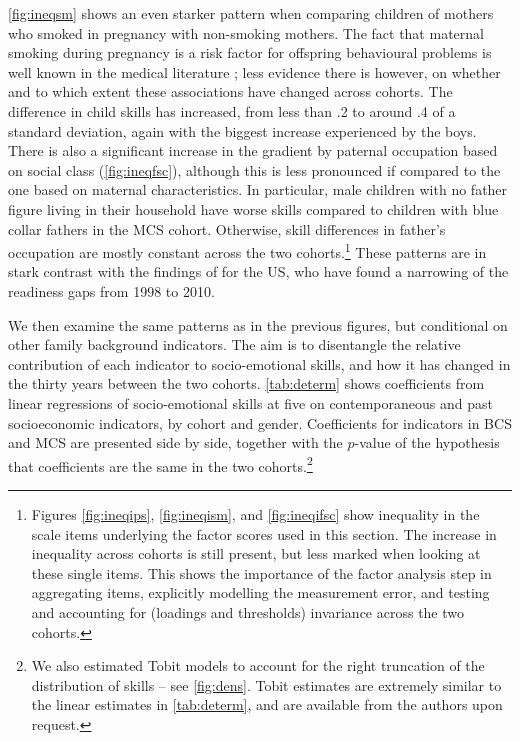 \autoref{fig:ineqsm} shows an even starker pattern when comparing children of mothers who smoked in pregnancy with non-smoking mothers. The fact that maternal smoking during pregnancy is a risk factor for offspring behavioural problems is well known in the medical literature \citep{Gaysina2013}; less evidence there is however, on whether and to which extent these associations have changed across cohorts. The difference in child skills has increased, from less than .2 to around .4 of a standard deviation, again with the biggest increase experienced by the boys. There is also a significant increase in the gradient by paternal occupation based on social class (\autoref{fig:ineqfsc}), although this is less pronounced if compared to the one based on maternal characteristics. In particular, male children with no father figure living in their household have worse skills compared to children with blue collar fathers in the MCS cohort. Otherwise, skill differences in father's occupation are mostly constant across the two cohorts.\footnote{Figures \ref{fig:ineqips}, \ref{fig:ineqism}, and \ref{fig:ineqifsc} show inequality in the scale items underlying the factor scores used in this section. The increase in inequality across cohorts is still present, but less marked when looking at these single items. This shows the importance of the factor analysis step in aggregating items, explicitly modelling the measurement error, and testing and accounting for (loadings and thresholds) invariance across the two cohorts.} These patterns are in stark contrast with the findings of \citet{Reardon2016} for the US, who have found a narrowing of the readiness gaps from 1998 to 2010.

We then examine the same patterns as in the previous figures, but conditional on other family background indicators. The aim is to disentangle the relative contribution of each indicator to socio-emotional skills, and how it has changed in the thirty years between the two cohorts. \autoref{tab:determ} shows coefficients from linear regressions of socio-emotional skills at five on contemporaneous and past socioeconomic indicators, by cohort and gender. Coefficients for indicators in BCS and MCS are presented side by side, together with the $p$-value of the hypothesis that coefficients are the same in the two cohorts.\footnote{We also estimated Tobit models to account for the right truncation of the distribution of skills -- see \autoref{fig:dens}. Tobit estimates are extremely similar to the linear estimates in \autoref{tab:determ}, and are available from the authors upon request.}

